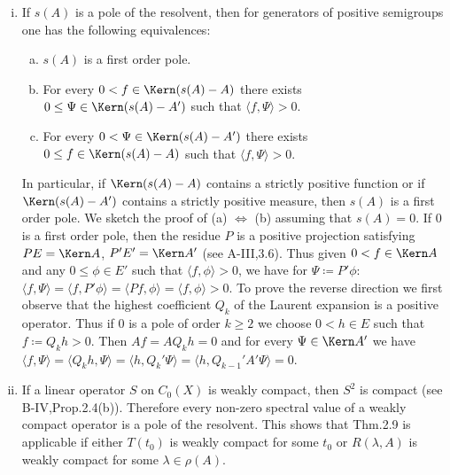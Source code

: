 \begin{remarks}\label{rem:b3-2.15}
	
	\begin{enumerate}[(i)]
	\item
	If $s(A)$ is a pole of the resolvent, then for generators of positive semigroups one has the following equivalences:
	
	\begin{enumerate}[(a)]
		\item 
		$s(A)$ is a first order pole.
		
		\item 
		For every $0 < f \in \Kern(s(A) - A)$ there exists $0 \leq \Psi \in \Kern(s(A) - A')$ such that $\langle f,\Psi \rangle > 0$.
		
		\item 
		For every $0 < \Psi \in \Kern(s(A) - A')$ there exists $0 \leq f \in \Kern(s(A) - A)$ such that $\langle f,\Psi \rangle > 0$.
	\end{enumerate}
	In particular, if $\Kern(s(A) - A)$ contains a strictly positive function or if $\Kern(s(A) - A')$ contains a strictly positive measure, then $s(A)$ is a first order pole.
%
%	
%
%
	We sketch the proof of (a) $\Leftrightarrow$ (b) assuming that $s(A) = 0$.
	If $0$ is a first order pole, then the residue $P$ is a positive projection satisfying $PE = \Kern A$, $P'E' = \Kern A'$ (see A-III,3.6).
	Thus given $0 < f \in \Kern A$ and any $0 \leq \phi \in E'$ such that $\langle f,\phi \rangle > 0$, we have for $\Psi \coloneqq P'\phi$: $\langle f,\Psi \rangle = \langle f,P'\phi \rangle = \langle Pf,\phi \rangle = \langle f,\phi \rangle > 0$.
	To prove the reverse direction we first observe that the highest coefficient $Q_{k}$ of the Laurent expansion is a positive operator.
	Thus if $0$ is a pole of order $k \geq 2$ we choose $0 < h \in E$ such that $f \coloneqq Q_{k}h > 0$.
	Then $Af = AQ_{k}h = 0$ and for every $\Psi \in \Kern A'$ we have $\langle f,\Psi \rangle = \langle Q_{k}h,\Psi \rangle = \langle h,Q_{k}'\Psi \rangle = \langle h,Q_{k-1}'A'\Psi \rangle = 0$.
	\item 
	If a linear operator $S$ on $C_{0}(X)$ is weakly compact, then $S^{2}$ is compact (see B-IV,Prop.2.4(b)).
	Therefore every non-zero spectral value of a weakly compact operator is a pole of the resolvent.
	This shows that Thm.2.9 is applicable if either $T(t_{0})$ is weakly compact for some $t_{0}$ or $R(\lambda,A)$ is weakly compact for some $\lambda \in \rho(A)$.

\end{enumerate}
\end{remarks}
